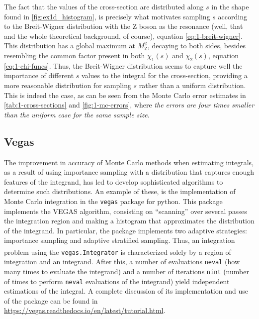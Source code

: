 \medskip

The fact that the values of the cross-section are distributed along $s$ in the shape found in \autoref{fig:ex1d_histogram}, is precisely what motivates sampling $s$ according to the Breit-Wigner distribution with the Z boson as the resonance (well, that and the whole theoretical background, of course), equation \eqref{eq:1-breit-wigner}. This distribution has a global maximum at $M_{\mathrm{Z}}^{2}$, decaying to both sides, besides resembling the common factor present in both $\chi_{1}(s)$ and $\chi_{2}(s)$, equation \eqref{eq:1-chi-funcs}. Thus, the Breit-Wigner distribution seems to capture well the importance of different $s$ values to the integral for the cross-section, providing a more reasonable distribution for sampling $s$ rather than a uniform distribution. This is indeed the case, as can be seen from the Monte Carlo error estimates in \autoref{tab:1-cross-sections} and \autoref{fig:1-mc-errors}, where \emph{the errors are four times smaller than the uniform case for the same sample size}.

\subsection{Vegas}

The improvement in accuracy of Monte Carlo methods when estimating integrals, as a result of using importance sampling with a distribution that captures enough features of the integrand, has led to develop sophisticated algorithms to determine such distributions. An example of these, is the implementation of Monte Carlo integration in the \texttt{vegas} package for python. This package implements the VEGAS algorithm, consisting on “scanning” over several passes the integration region and making a histogram that approximates the distribution of the integrand. In particular, the package implements two adaptive strategies: importance sampling and adaptive stratified sampling. Thus, an integration problem using the \texttt{vegas.Integrator}\textsuperscript{\texttrademark} is characterized solely by a region of integration and an integrand. After this, a number of evaluations \texttt{neval} (how many times to evaluate the integrand) and a number of iterations \texttt{nint} (number of times to perform \texttt{neval} evaluations of the integrand) yield independent estimations of the integral. A complete discussion of its implementation and use of the package can be found in \url{https://vegas.readthedocs.io/en/latest/tutorial.html}. 

